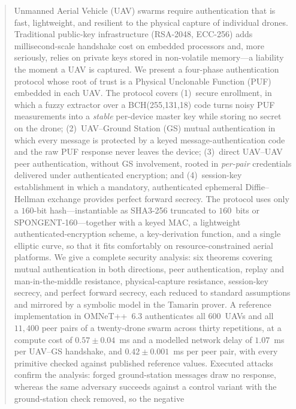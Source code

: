 \documentclass[11pt,a4paper]{article}
\begin{document}
\setcounter{page}{1}
\begin{abstract}
\noindent
Unmanned Aerial Vehicle (UAV) swarms require authentication that is fast,
lightweight, and resilient to the physical capture of individual drones.
Traditional public-key infrastructure (RSA-2048, ECC-256) adds
millisecond-scale handshake cost on embedded processors and, more seriously,
relies on private keys stored in non-volatile memory---a liability the moment
a UAV is captured. We present a four-phase authentication protocol whose root
of trust is a Physical Unclonable Function (PUF) embedded in each UAV. The
protocol covers (1)~secure enrollment, in which a fuzzy extractor over a
BCH(255,131,18) code turns noisy PUF measurements into a \emph{stable}
per-device master key while storing no secret on the drone; (2)~UAV--Ground
Station (GS) mutual authentication in which every message is protected by a
keyed message-authentication code and the raw PUF response never leaves the
device; (3)~direct UAV--UAV peer authentication, without GS involvement,
rooted in \emph{per-pair} credentials delivered under authenticated
encryption; and (4)~session-key establishment in which a mandatory,
authenticated ephemeral Diffie--Hellman exchange provides perfect forward
secrecy. The protocol uses only a $160$-bit hash---instantiable as SHA3-256
truncated to $160$~bits or SPONGENT-160---together with a keyed MAC, a
lightweight authenticated-encryption scheme, a key-derivation function, and a
single elliptic curve, so that it fits comfortably on resource-constrained
aerial platforms. We give a complete security analysis: six theorems
covering mutual authentication in both directions, peer authentication, replay
and man-in-the-middle resistance, physical-capture resistance, session-key
secrecy, and perfect forward secrecy, each reduced to standard assumptions and
mirrored by a symbolic model in the Tamarin prover. A reference implementation in
OMNeT++~6.3 authenticates all $600$~UAVs and all $11{,}400$ peer pairs of a
twenty-drone swarm across thirty repetitions, at a compute cost of
$0.57 \pm 0.04$~ms and a modelled network delay of $1.07$~ms per UAV--GS
handshake, and $0.42 \pm 0.001$~ms per peer pair, with every primitive checked
against published reference values. Executed attacks confirm the analysis: forged
ground-station messages draw no response, whereas the same adversary succeeds
against a control variant with the ground-station check removed, so the negative

\end{abstract}
\end{document}
